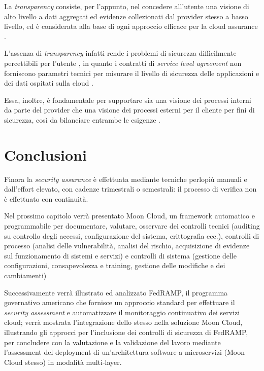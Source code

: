 \documentclass[../main.tex]{subfiles}
\begin{document}
La \textit{transparency} consiste, per l'appunto, nel concedere all'utente una visione di alto livello a dati aggregati ed evidenze collezionati dal provider stesso a basso livello, ed è considerata alla base di ogni approccio efficace per la cloud assurance \cite{6814039} \cite{6375614}.


L'assenza di \textit{transparency} infatti rende i problemi di sicurezza difficilmente percettibili per l'utente \cite{Ardagna:2015:SAC:2808687.2767005}, in quanto i contratti di \textit{service level agreement} non forniscono parametri tecnici per misurare il livello di sicurezza delle applicazioni e dei dati ospitati sulla cloud \cite{6684427}.

Essa, inoltre, è fondamentale per supportare sia una visione dei processi interni da parte del provider che una visione dei processi esterni per il cliente per fini di sicurezza, così da bilanciare entrambe le esigenze \cite{Ardagna:2015:SAC:2808687.2767005}.

\section{Conclusioni}

Finora la \textit{security assurance} è effettuata mediante tecniche perlopiù manuali e dall'effort elevato, con cadenze trimestrali o semestrali: il processo di verifica non è effettuato con continuità.

Nel prossimo capitolo verrà presentato Moon Cloud, un framework automatico e programmabile per documentare, valutare, osservare dei controlli tecnici (auditing su controllo degli accessi, configurazione del sistema, crittografia ecc.), controlli di processo (analisi delle vulnerabilità, analisi del rischio, acquisizione di evidenze sul funzionamento di sistemi e servizi) e controlli di sistema (gestione delle configurazioni, consapevolezza e training, gestione delle modifiche e dei cambiamenti)


Successivamente verrà illustrato ed analizzato FedRAMP, il programma governativo americano che fornisce un approccio standard per effettuare il \textit{security assessment} e automatizzare il monitoraggio continuativo dei servizi cloud; verrà mostrata l'integrazione dello stesso nella soluzione Moon Cloud, illustrando gli approcci per l'inclusione dei controlli di sicurezza di FedRAMP, per concludere con la valutazione e la validazione del lavoro mediante l'assessment del deployment di un'architettura software a microservizi (Moon Cloud stesso) in modalità multi-layer.
\end{document}
